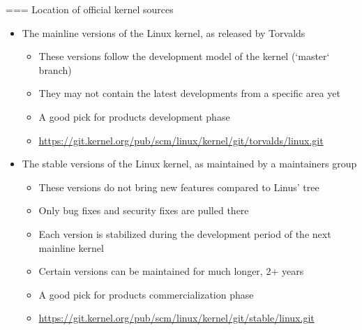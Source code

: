 === Location of official kernel sources
  \begin{itemize}
  \item The mainline versions of the Linux kernel, as released by Torvalds
    \begin{itemize}
    \item These versions follow the development model of the kernel
          (`master` branch)
    \item They may not contain the latest developments from a specific
      area yet
    \item A good pick for products development phase
    \item \url{https://git.kernel.org/pub/scm/linux/kernel/git/torvalds/linux.git}
    \end{itemize}
    \item The stable versions of the Linux kernel, as maintained by a
      maintainers group
    \begin{itemize}
    \item These versions do not bring new features compared to Linus'
      tree
    \item Only bug fixes and security fixes are pulled there
    \item Each version is stabilized during the development period of
      the next mainline kernel
    \item Certain versions can be maintained for much longer, 2$+$ years
    \item A good pick for products commercialization phase
    \item \url{https://git.kernel.org/pub/scm/linux/kernel/git/stable/linux.git}
    \end{itemize}
  \end{itemize}



